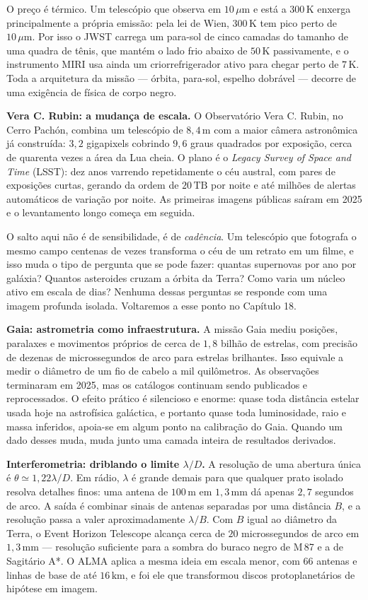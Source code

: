 \documentclass[11pt,a4paper]{article}
\begin{document}
O preço é térmico. Um telescópio que observa em $10\,\mu\mathrm{m}$ e está a $300\,\mathrm{K}$ enxerga principalmente a própria emissão: pela lei de Wien, $300\,\mathrm{K}$ tem pico perto de $10\,\mu\mathrm{m}$. Por isso o JWST carrega um para-sol de cinco camadas do tamanho de uma quadra de tênis, que mantém o lado frio abaixo de $50\,\mathrm{K}$ passivamente, e o instrumento MIRI usa ainda um criorrefrigerador ativo para chegar perto de $7\,\mathrm{K}$. Toda a arquitetura da missão --- órbita, para-sol, espelho dobrável --- decorre de uma exigência de física de corpo negro.

\textbf{Vera C. Rubin: a mudança de escala.} O Observatório Vera C. Rubin, no Cerro Pachón, combina um telescópio de $8{,}4\,\mathrm{m}$ com a maior câmera astronômica já construída: $3{,}2$ gigapixels cobrindo $9{,}6$ graus quadrados por exposição, cerca de quarenta vezes a área da Lua cheia. O plano é o \textit{Legacy Survey of Space and Time} (LSST): dez anos varrendo repetidamente o céu austral, com pares de exposições curtas, gerando da ordem de $20\,\mathrm{TB}$ por noite e até milhões de alertas automáticos de variação por noite. As primeiras imagens públicas saíram em 2025 e o levantamento longo começa em seguida.

O salto aqui não é de sensibilidade, é de \emph{cadência}. Um telescópio que fotografa o mesmo campo centenas de vezes transforma o céu de um retrato em um filme, e isso muda o tipo de pergunta que se pode fazer: quantas supernovas por ano por galáxia? Quantos asteroides cruzam a órbita da Terra? Como varia um núcleo ativo em escala de dias? Nenhuma dessas perguntas se responde com uma imagem profunda isolada. Voltaremos a esse ponto no Capítulo 18.

\textbf{Gaia: astrometria como infraestrutura.} A missão Gaia mediu posições, paralaxes e movimentos próprios de cerca de $1{,}8$ bilhão de estrelas, com precisão de dezenas de microssegundos de arco para estrelas brilhantes. Isso equivale a medir o diâmetro de um fio de cabelo a mil quilômetros. As observações terminaram em 2025, mas os catálogos continuam sendo publicados e reprocessados. O efeito prático é silencioso e enorme: quase toda distância estelar usada hoje na astrofísica galáctica, e portanto quase toda luminosidade, raio e massa inferidos, apoia-se em algum ponto na calibração do Gaia. Quando um dado desses muda, muda junto uma camada inteira de resultados derivados.

\textbf{Interferometria: driblando o limite $\lambda/D$.} A resolução de uma abertura única é $\theta\simeq1{,}22\lambda/D$. Em rádio, $\lambda$ é grande demais para que qualquer prato isolado resolva detalhes finos: uma antena de $100\,\mathrm{m}$ em $1{,}3\,\mathrm{mm}$ dá apenas $2{,}7$ segundos de arco. A saída é combinar sinais de antenas separadas por uma distância $B$, e a resolução passa a valer aproximadamente $\lambda/B$. Com $B$ igual ao diâmetro da Terra, o Event Horizon Telescope alcança cerca de $20$ microssegundos de arco em $1{,}3\,\mathrm{mm}$ --- resolução suficiente para a sombra do buraco negro de M\,87 e a de Sagitário A*. O ALMA aplica a mesma ideia em escala menor, com 66 antenas e linhas de base de até $16\,\mathrm{km}$, e foi ele que transformou discos protoplanetários de hipótese em imagem.
\end{document}
